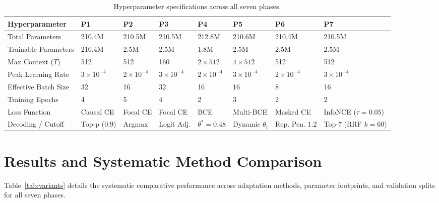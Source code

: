 \documentclass[11pt, oneside]{article}
\begin{document}
\begin{table}[H]
\centering
\small
\caption{Hyperparameter specifications across all seven phases.}
\label{tab:hparams}
\begin{tabularx}{\textwidth}{lXXXXXXX}
\toprule
\textbf{Hyperparameter} & \textbf{P1} & \textbf{P2} & \textbf{P3} & \textbf{P4} & \textbf{P5} & \textbf{P6} & \textbf{P7} \\
\midrule
Total Parameters & 210.4M & 210.5M & 210.5M & 212.8M & 210.6M & 210.4M & 210.5M \\
Trainable Parameters & 210.4M & 2.5M & 2.5M & 1.8M & 2.5M & 2.5M & 2.5M \\
Max Context ($T$) & 512 & 512 & 160 & $2 \times 512$ & $4 \times 512$ & 512 & 512 \\
Peak Learning Rate & $3 \times 10^{-4}$ & $2 \times 10^{-4}$ & $3 \times 10^{-4}$ & $2 \times 10^{-4}$ & $3 \times 10^{-4}$ & $2 \times 10^{-4}$ & $3 \times 10^{-4}$ \\
Effective Batch Size & 32 & 16 & 32 & 16 & 16 & 8 & 16 \\
Training Epochs & 4 & 5 & 4 & 2 & 3 & 2 & 2 \\
Loss Function & Causal CE & Focal CE & Focal CE & BCE & Multi-BCE & Masked CE & InfoNCE ($\tau=0.05$) \\
Decoding / Cutoff & Top-p ($0.9$) & Argmax & Logit Adj. & $\theta^*=0.48$ & Dynamic $\theta_i$ & Rep. Pen. $1.2$ & Top-7 (RRF $k=60$) \\
\bottomrule
\end{tabularx}
\end{table}

\section{Results and Systematic Method Comparison}
\noindent
Table~\ref{tab:variants} details the systematic comparative performance across adaptation methods, parameter footprints, and validation splits for all seven phases.
\end{document}
